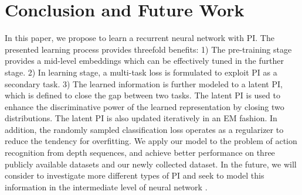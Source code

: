 \documentclass[10pt,twocolumn,letterpaper]{article}
\begin{document}
\section{Conclusion and Future Work}
\vspace{-0.15cm}
 In this paper, we propose to learn a recurrent neural network with PI. The presented learning process provides threefold benefits: 1) The pre-training stage provides a mid-level embeddings which can be effectively tuned in the further stage. 2) In learning stage, a multi-task loss is formulated to exploit PI as a secondary task. 3) The learned information is further modeled to a latent PI, which is defined to close the gap between two tasks. The latent PI is used to enhance the discriminative power of the learned representation by closing two distributions. The latent PI is also updated iteratively in an EM fashion. In addition, the randomly sampled classification loss operates as a regularizer to reduce the tendency for overfitting. We apply our model to the problem of action recognition from depth sequences, and achieve better performance on three publicly available datasets and our newly collected dataset. In the future, we will consider to investigate more different types of PI and seek to model this information in the intermediate level of neural network \cite{JMLR_gulchere16a}. 



{\small


}
\end{document}
